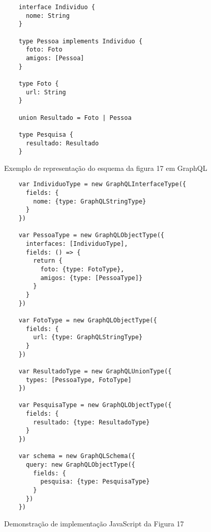 \begin{figure}[H]
  \centering
  \begin{verbatim}
    interface Individuo {
      nome: String
    }

    type Pessoa implements Individuo {
      foto: Foto
      amigos: [Pessoa]
    }

    type Foto {
      url: String
    }

    union Resultado = Foto | Pessoa

    type Pesquisa {
      resultado: Resultado
    }
  \end{verbatim}
  \caption{Exemplo de representação do esquema da figura 17 em GraphQL}
\end{figure}

\begin{figure}[H]
  \centering
  \begin{verbatim}
    var IndividuoType = new GraphQLInterfaceType({
      fields: {
        nome: {type: GraphQLStringType}
      }
    })

    var PessoaType = new GraphQLObjectType({
      interfaces: [IndividuoType],
      fields: () => {
        return {
          foto: {type: FotoType},
          amigos: {type: [PessoaType]}
        }
      }
    })

    var FotoType = new GraphQLObjectType({
      fields: {
        url: {type: GraphQLStringType}
      }
    })

    var ResultadoType = new GraphQLUnionType({
      types: [PessoaType, FotoType]
    })

    var PesquisaType = new GraphQLObjectType({
      fields: {
        resultado: {type: ResultadoType}
      }
    })

    var schema = new GraphQLSchema({
      query: new GraphQLObjectType({
        fields: {
          pesquisa: {type: PesquisaType}
        }
      })
    })
  \end{verbatim}
  \caption{Demonstração de implementação JavaScript da Figura 17}
\end{figure}
